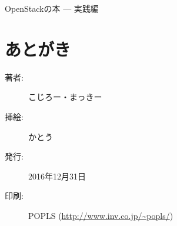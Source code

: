 \documentclass[10pt,b5paper,openany]{jsbook}
\begin{document}
{\Huge OpenStackの本 --- 実践編}

\begin{minipage}{\textwidth}
	\tableofcontents
\end{minipage}

\thispagestyle{empty}





\chapter{あとがき}

\begin{minipage}{0.5\paperwidth}
	\begin{description}
		\item[著者:]こじろー・まっきー
		\item[挿絵:]かとう
		\item[発行:]2016年12月31日
		\item[印刷:]POPLS (\url{http://www.inv.co.jp/~popls/})
	\end{description}
\end{minipage}
\end{document}
